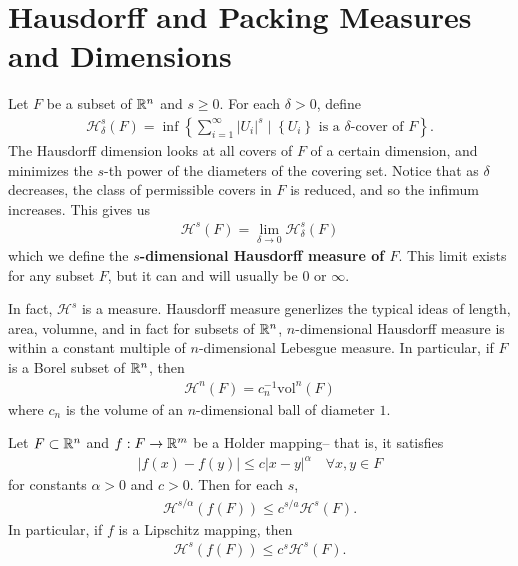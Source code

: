 \documentclass{memoir}
\begin{document}


\chapter{Hausdorff and Packing Measures and Dimensions}
\label{cha:hausdorff_and_packing_measures_and_dimensions}

\begin{defn}
	Let \(F\) be a subset of \(\mathbb{R}^{n}\) and \(s\geq 0\). For each \(\delta>0\), define
	\begin{align*}
		\mathcal{H}^{s}_{\delta}(F) = \inf \left\{\sum_{i=1}^{\infty} \left| U_i \right|^{s} \mid \left\{ U_i \right\} \text{ is a \(\delta\)-cover of \(F\)} \right\} .
	\end{align*}
The Hausdorff dimension looks at all covers of \(F\) of a certain dimension, and minimizes the \(s\)-th power of the diameters of the covering set. Notice that as \(\delta\) decreases, the class of permissible covers in \(F\) is reduced, and so the infimum increases. This gives us
\begin{align*}
	\mathcal{H}^{s}(F) = \lim_{\delta \to 0} \mathcal{H}^{s}_{\delta}(F)
\end{align*}
which we define the \textbf{\(s\)-dimensional Hausdorff measure of \(F\)}. This limit exists for any subset \(F\), but it can and will usually be \(0\) or \(\infty\).
\end{defn}
In fact, \(\mathcal{H}^{s}\) is a measure. Hausdorff measure generlizes the typical ideas of length, area, volumne, and in fact for subsets of \(\mathbb{R}^{n}\), \(n\)-dimensional Hausdorff measure is within a constant multiple of \(n\)-dimensional Lebesgue measure. In particular, if \(F\) is a Borel subset of \(\mathbb{R}^{n}\), then
\begin{align*}
	\mathcal{H}^{n}(F) = c^{-1}_n \textrm{vol}^{n}(F)
\end{align*}
where \(c_n\) is the volume of an \(n\)-dimensional ball of diameter \(1\).

\begin{prop}
	Let \(F\subset \mathbb{R}^{n}\) and \(f:F\to \mathbb{R}^{m}\) be a Holder mapping-- that is, it satisfies
	\begin{align*}
		\left| f(x) - f(y) \right| \leq c \left| x-y \right|^{\alpha} \quad \forall x,y \in F
	\end{align*}
	for constants \(\alpha > 0\) and \(c > 0\). Then for each \(s\),
	\begin{align*}
		\mathcal{H}^{s / \alpha}(f(F)) \leq c^{s / a}\mathcal{H}^{s}(F).
	\end{align*}
	In particular, if \(f\) is a Lipschitz mapping, then
	\begin{align*}
		\mathcal{H}^{s}(f(F)) \leq c^{s}\mathcal{H}^{s}(F).
	\end{align*}
\end{prop}
\end{document}
